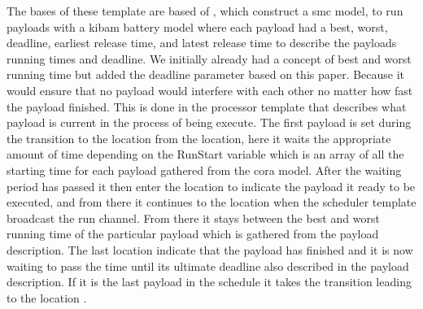 The bases of these template are based of \cite{battery_aware_scheduling}, which construct a \gls{smc} model, to run payloads with a \gls{kibam} battery model where each payload had a best, worst, deadline, earliest release time, and latest release time to describe the payloads running times and deadline. We initially already had a concept of best and worst running time but added the deadline parameter based on this paper. Because it would ensure that no payload would interfere with each other no matter how fast the payload finished. This is done in the processor template that describes what payload is current in the process of being execute. The first payload is set during the transition to the  location from the  location, here it waits the appropriate amount of time depending on the RunStart variable which is an array of all the starting time for each payload gathered from the \gls{cora} model. After the waiting period has passed it then enter the  location to indicate the payload it ready to be executed, and from there it continues to the  location when the scheduler template broadcast the run channel. From there it stays between the best and worst running time of the particular payload which is gathered from the payload description. The last location  indicate that the payload has finished and it is now waiting to pass the time until its ultimate deadline also described in the payload description. If it is the last payload in the schedule it takes the transition leading to the location .


